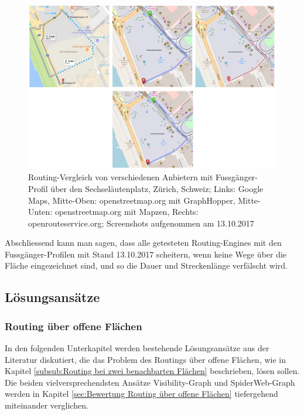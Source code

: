 \begin{figure}[ht]
\centering
\includegraphics[width=1\linewidth]{technicalreport/img/sechselaeutenplatz_comparison}
\caption[Fussgänger-Routing Vergleich]{Routing-Vergleich von verschiedenen Anbietern mit Fussgänger-Profil über den Sechseläutenplatz, Zürich, Schweiz; Links: Google Maps, Mitte-Oben: openstreetmap.org mit GraphHopper, Mitte-Unten: openstreetmap.org mit Mapzen, Rechts: openrouteservice.org; Screenshots aufgenommen am 13.10.2017}
\label{fig:sechselaeutenplatz_comparison}
\end{figure}


Abschliessend kann man sagen, dass alle getesteten Routing-Engines mit den Fussgänger-Profilen mit Stand 13.10.2017 scheitern, wenn keine Wege über die Fläche eingezeichnet sind, und so die Dauer und Streckenlänge verfälscht wird.

\subsection{Lösungsansätze}
\label{sub:Lösungsansätze}


\subsubsection{Routing über offene Flächen}
\label{solution:Routing über offene Flächen}

In den folgenden Unterkapitel werden bestehende Lösungsansätze aus der Literatur diskutiert, die das Problem des Routings über offene Flächen, wie in Kapitel \ref{subsub:Routing bei zwei benachbarten Flächen} beschrieben, lösen sollen. Die beiden vielversprechendsten Ansätze Visibility-Graph und SpiderWeb-Graph werden in Kapitel \ref{sec:Bewertung Routing über offene Flächen} tiefergehend miteinander verglichen.

